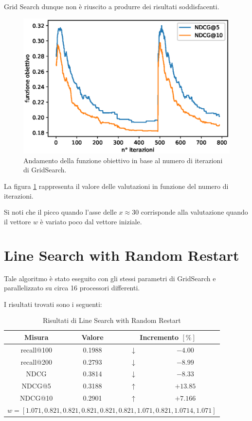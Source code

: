 Grid Search dunque non è riuscito a produrre dei risultati soddisfacenti.
\pagebreak

\begin{figure}[h!]
	\centering
	\includegraphics[width=0.7\linewidth]{figure/gs_search}
	\caption[Andamento della funzione obiettivo utilizzando GridSearch]{Andamento della funzione obiettivo in base al numero di iterazioni di GridSearch.}
	\label{fig:gssearch}
\end{figure}

La figura \ref{fig:gssearch} rappresenta il valore delle valutazioni in funzione del numero di iterazioni.

Si noti che il picco quando l'asse delle $x \approx 30$ corrisponde alla valutazione quando il vettore $w$ è variato
poco dal vettore iniziale.

\newpage

\section{Line Search with Random Restart}

Tale algoritmo è stato eseguito con gli stessi parametri di GridSearch e parallelizzato
su circa 16 processori differenti.

I risultati trovati sono i seguenti:

\begin{table}[h!]
	\centering
	\begin{tabular}{|c|c|c|c|}
		\hline
		\textbf{Misura} & \textbf{Valore} & \multicolumn{2}{|c|}{\textbf{Incremento} $\left[\%\right]$} \\
		\hline
		recall@100 &  0.1988 & $\downarrow$ & $-4.00$   \\
		\hline
		recall@200 & 0.2793  & $\downarrow$ & $-8.99$ \\
		\hline
		NDCG & 0.3814 & $\downarrow$ & $-8.33$\\
		\hline
		NDCG@5 & 0.3188 & $\uparrow$ & $+13.85$ \\
		\hline
		NDCG@10 & 0.2901 & $\uparrow$ & $+7.166$ \\
		\hline
		\multicolumn{4}{|c|}{
			$w = [1.071, 0.821, 0.821, 0.821, 0.821, 0.821, 1.071, 0.821, 1.0714, 1.071]$ 
		} \\
	\hline
	\end{tabular}
	\caption{Risultati di Line Search with Random Restart}
\end{table}

